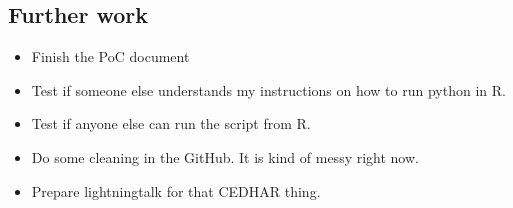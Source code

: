 \documentclass{article}
\begin{document}
\subsection{Further work}
\begin{itemize}
    \item Finish the PoC document
    \item Test if someone else understands my instructions on how to run python in R.
    \item Test if anyone else can run the script from R.
    \item Do some cleaning in the GitHub. It is kind of messy right now.
    \item Prepare lightningtalk for that CEDHAR thing.
\end{itemize}
\end{document}
